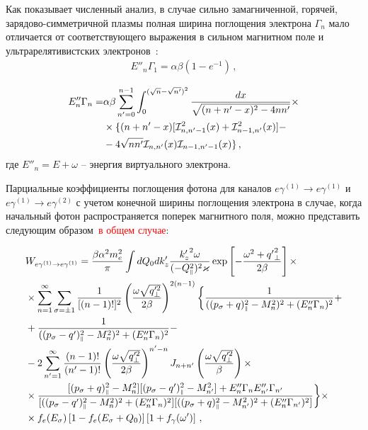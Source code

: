 Как показывает численный анализ, в 
случае сильно замагниченной, горячей, зарядово-симметричной плазмы полная 
ширина поглощения электрона $\Gamma_n$ мало отличается от соответствующего 
выражения в 
сильном магнитном поле и ультрарелятивистских электронов~\cite{KM_Book_2013}:
\begin{equation}
	\begin{aligned}
		E''_n\Gamma_1=\alpha \beta
		(1-e^{-1})\, ,
	\end{aligned}
\end{equation}

\begin{equation}\label{Shir}
	\begin{aligned}
		E''_n\Gamma_n=&\alpha \beta \sum_{n'=0}^{n-1}\int_{0}^{(\sqrt{n}-\sqrt{n'})^2}\frac{dx}{\sqrt{(n+n'-x)^2-4n n'}}\times\\
		&\times\{(n+n'-x)[{\cal I}^2_{n,n'-1}(x)+{\cal I}^2_{n-1,n'}(x)]-\\
		&-4\sqrt{nn'}{\cal I}_{n,n'}(x){\cal I}_{n-1,n'-1}(x)\}\, ,
	\end{aligned}
\end{equation}
где $E''_n=E+\omega$ -- энергия виртуального электрона.

 Парциальные коэффициенты поглощения фотона для каналов $e \gamma^{(1)} \to 
 e\gamma^{(1)}$ и $e \gamma^{(1)} \to e\gamma^{(2)}$ с учетом конечной ширины 
 поглощения электрона в случае, когда начальный фотон 
 распространяется поперек магнитного поля, можно 
 представить следующим образом~\textcolor{red}{в общем случае}:


\begin{equation}
	\begin{aligned}\label{Wres}
		&W_{e\gamma^{(1)}\to e\gamma^{(1)}}=\frac{\beta\alpha^2m_e^2}{\pi} \int 
		dQ_0dk'_z \frac{{k_z'}^2\omega } 
		{(-Q_{\mbox{\tiny $\|$}}^2)^2\varkappa}\exp\left[-\frac{\omega^2+{q'}_\perp^2}{2\beta}\right]\times
		\\
		&\times\sum_{n=1}^{\infty}\sum_{\sigma=\pm 1}\frac{1}{[(n-1)!]^2}\left(\frac{\omega \sqrt{q_\perp'^2}}{2\beta}\right)^{2(n-1)}\bigg\{
		\frac{1}{((p_\sigma+q)_{\mbox{\tiny $\|$}}^2-M_n^2)^2+(E''_n\Gamma_n)^2}  +\\
		&+\frac{1}{((p_\sigma-q')_{\mbox{\tiny $\|$}}^2-M_n^2)^2+(E''_n\Gamma_n)^2}-
		\\
		&-2
		\sum_{n'=1}^{\infty}\frac{(n-1)!}{(n'-1)!}\left(\frac{\omega \sqrt{q_\perp'^2}}{2\beta}\right)^{n'-n}J_{n+n'}\left(\frac{\omega \sqrt{q_\perp'^2}}{\beta}\right)\times\\
		&\times\frac{[(p_\sigma+q)^2_{\mbox{\tiny $\|$}}-M_n^2][(p_\sigma-q')^2_{\mbox{\tiny $\|$}}-M^2_{n'}]+E''_n\Gamma_nE''_{n'}\Gamma_{n'}}{[((p_\sigma-q')_{\mbox{\tiny $\|$}}^2-M_n^2)^2+(E''_n\Gamma_n)^2][((p_\sigma+q)_{\mbox{\tiny $\|$}}^2-M_{n'}^2)^2+(E''_n\Gamma_{n'})^2]}
		\bigg\}\times
		\\&\times 
		f_e{(E_\sigma)}\left[1-f_e{(E_\sigma+Q_0)}\right]\left[1+f_\gamma(\omega')\right]
		 \, ,
	\end{aligned}
\end{equation}


